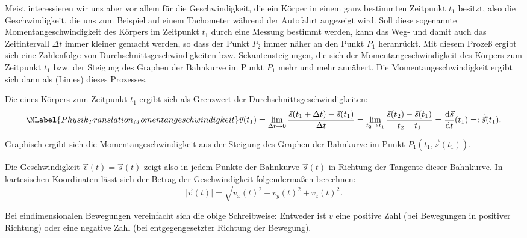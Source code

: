 \begin{MContent}
  
  Meist interessieren wir uns aber vor allem f\"ur die Geschwindigkeit, die ein K\"orper in einem ganz bestimmten Zeitpunkt $t_1$ besitzt, also die Geschwindigkeit, die uns zum Beispiel auf einem Tachometer w\"ahrend der Autofahrt angezeigt wird. Soll diese sogenannte Momentangeschwindigkeit des K\"orpers im Zeitpunkt $t_1$ durch eine Messung bestimmt werden, kann das Weg- und damit auch das Zeitintervall $\Delta t$ immer kleiner gemacht werden, so dass der Punkt $P_2$ immer n\"aher an den Punkt $P_1$ heranr\"uckt. Mit diesem Proze{\ss} ergibt sich eine Zahlenfolge von Durchschnittsgeschwindigkeiten bzw. Sekantensteigungen, die sich der Momentangeschwindigkeit des K\"orpers zum Zeitpunkt $t_1$ bzw. der Steigung des Graphen der Bahnkurve im Punkt $P_1$ mehr und mehr ann\"ahert. Die Momentangeschwindigkeit ergibt sich dann als  (Limes) dieses Prozesses.
  
  
  \begin{MInfo}
  Die  eines K\"orpers zum Zeitpunkt $t_1$ ergibt sich als Grenzwert der Durchschnittsgeschwindigkeiten: 
     \begin{equation}\MLabel{Physik_Translation_Momentangeschwindigkeit}
    \vec{v}(t_1)=\lim_{\Delta t\rightarrow 0} \frac{\vec{s}(t_1+\Delta t)-\vec{s}(t_1)}{\Delta t}=\lim_{t_2\rightarrow t_1}\frac{\vec{s}(t_2)-\vec{s}(t_1)}{t_2-t_1}=\frac{\textrm{d}\vec{s}}{\textrm{d}t}(t_1)=:\dot{\vec{s}}(t_1).
    \end{equation}
   \end{MInfo}
    Graphisch ergibt sich die Momentangeschwindigkeit aus der Steigung des Graphen der Bahnkurve im Punkt $P_1(t_1,\vec{s}(t_1))$.
    
   
   Die Geschwindigkeit $\vec{v}(t)=\dot{\vec{s}}(t)$ zeigt also in jedem Punkte der Bahnkurve $\vec{s}(t)$ in Richtung der Tangente dieser Bahnkurve. In kartesischen Koordinaten l\"asst sich der Betrag der Geschwindigkeit folgenderma{\ss}en berechnen:
   \begin{equation*}
   \vert{\vec{v}(t)}\vert=\sqrt{v_x(t)^2+v_y(t)^2+v_z(t)^2}.
   \end{equation*}
   
   Bei eindimensionalen Bewegungen vereinfacht sich die obige Schreibweise: Entweder ist $v$ eine positive Zahl (bei Bewegungen in positiver Richtung) oder eine negative Zahl (bei entgegengesetzter Richtung der Bewegung).
   
\end{MContent}

